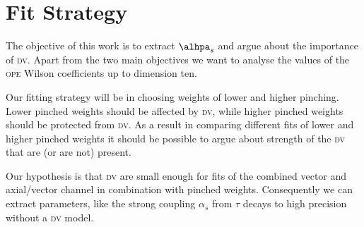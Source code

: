\documentclass[../../index.tex]{subfiles}
\begin{document}
\section{Fit Strategy}
The objective of this work is to extract \(\alhpa_s\) and argue about the
importance of \textsc{dv}. Apart from the two main objectives we want to analyse
the values of the \textsc{ope} Wilson coefficients up to dimension ten.

Our fitting strategy will be in choosing weights of lower and higher pinching.
Lower pinched weights should be affected by \textsc{dv}, while higher pinched
weights should be protected from \textsc{dv}. As a result in comparing different
fits of lower and higher pinched weights it should be possible to argue about
strength of the \textsc{dv} that are (or are not) present.

Our hypothesis is that \textsc{dv} are small enough for fits of the combined
vector and axial\-/vector channel in combination with pinched weights.
Consequently we can extract parameters, like the strong coupling \(\alpha_s\)
from \(\tau\) decays to high precision without a \textsc{dv} model.
\end{document}
